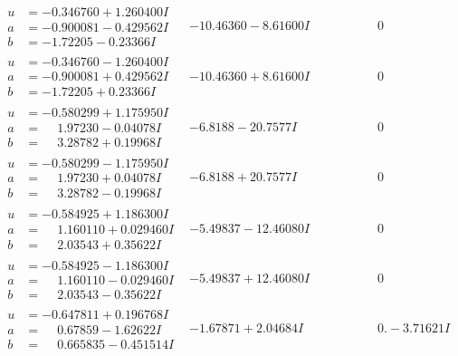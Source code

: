\documentclass[1p]{elsarticle_modified}
\theoremstyle{definition}
\begin{document}
$$\begin{array}{c|c|c}
\begin{aligned}
u &= -0.346760 + 1.260400 I \\
a &= -0.900081 - 0.429562 I \\
b &= -1.72205 - 0.23366 I\end{aligned}
 & -10.46360 - 8.61600 I & \phantom{-0.000000 } 0 \\ \hline\begin{aligned}
u &= -0.346760 - 1.260400 I \\
a &= -0.900081 + 0.429562 I \\
b &= -1.72205 + 0.23366 I\end{aligned}
 & -10.46360 + 8.61600 I & \phantom{-0.000000 } 0 \\ \hline\begin{aligned}
u &= -0.580299 + 1.175950 I \\
a &= \phantom{-}1.97230 - 0.04078 I \\
b &= \phantom{-}3.28782 + 0.19968 I\end{aligned}
 & -6.8188 - 20.7577 I & \phantom{-0.000000 } 0 \\ \hline\begin{aligned}
u &= -0.580299 - 1.175950 I \\
a &= \phantom{-}1.97230 + 0.04078 I \\
b &= \phantom{-}3.28782 - 0.19968 I\end{aligned}
 & -6.8188 + 20.7577 I & \phantom{-0.000000 } 0 \\ \hline\begin{aligned}
u &= -0.584925 + 1.186300 I \\
a &= \phantom{-}1.160110 + 0.029460 I \\
b &= \phantom{-}2.03543 + 0.35622 I\end{aligned}
 & -5.49837 - 12.46080 I & \phantom{-0.000000 } 0 \\ \hline\begin{aligned}
u &= -0.584925 - 1.186300 I \\
a &= \phantom{-}1.160110 - 0.029460 I \\
b &= \phantom{-}2.03543 - 0.35622 I\end{aligned}
 & -5.49837 + 12.46080 I & \phantom{-0.000000 } 0 \\ \hline\begin{aligned}
u &= -0.647811 + 0.196768 I \\
a &= \phantom{-}0.67859 - 1.62622 I \\
b &= \phantom{-}0.665835 - 0.451514 I\end{aligned}
 & -1.67871 + 2.04684 I & \phantom{-0.000000 } 0. - 3.71621 I \\ \hline\begin{aligned}

\end{aligned}
\end{array}$$
\end{document}
